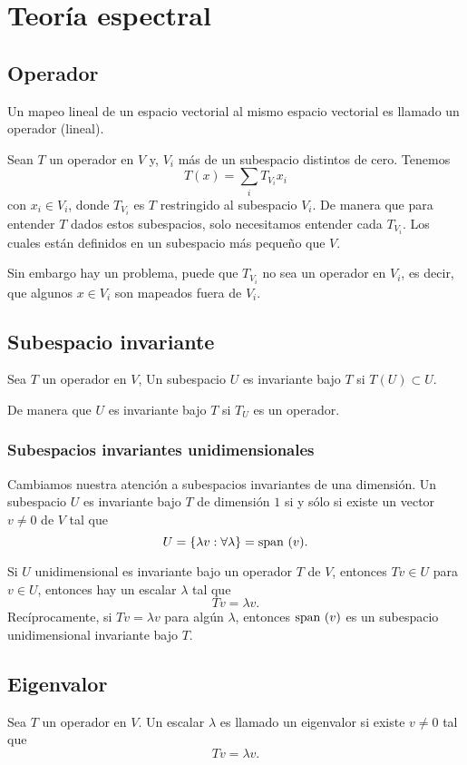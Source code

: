 \documentclass{article}
\begin{document}
\section{Teoría espectral}
\subsection{Operador}
Un mapeo lineal de un espacio vectorial al mismo espacio 
vectorial es llamado un operador (lineal).

Sean $T$ un operador en $V$ y, $V_i$ más de un subespacio
distintos de cero. Tenemos
$$T(x) = \sum_i T_{V_i}x_i$$
con $x_i\in V_i$, donde $T_{V_i}$ es $T$ restringido al
subespacio $V_i$. De manera que para entender $T$ dados
estos subespacios, solo necesitamos entender cada $T_{V_i}$.
Los cuales están definidos en un subespacio más pequeño que
$V$.

Sin embargo hay un problema, puede que $T_{V_i}$ no sea un
operador en $V_i$, es decir, que algunos $x\in V_i$
son mapeados fuera de $V_i$.

\subsection{Subespacio invariante}
Sea $T$ un operador en $V$, Un subespacio $U$ es invariante
bajo $T$ si $T(U)\subset U$.

De manera que $U$ es invariante bajo $T$ si $T_U$ es un
operador.

\subsubsection*{Subespacios invariantes unidimensionales}
Cambiamos nuestra atención a subespacios invariantes de una
dimensión. Un subespacio $U$ es invariante bajo $T$
de dimensión $1$
si y sólo si existe un vector $v\neq 0$ de $V$ tal que
$$U = \{\lambda v: \forall \lambda\} = \text{span }(v).$$

Si $U$ unidimensional es invariante bajo un operador $T$ de 
$V$, entonces $Tv\in U$ para $v\in U$, entonces hay un 
escalar $\lambda$ tal que 
$$Tv=\lambda v.$$
Recíprocamente, si $Tv=\lambda v$ para algún $\lambda$,
entonces $\text{span }(v)$ es un subespacio
unidimensional invariante bajo $T$.

\subsection{Eigenvalor}
Sea $T$ un operador en $V$. Un escalar $\lambda$ es llamado
un eigenvalor si existe $v\neq 0$ tal que
$$Tv=\lambda v.$$
\newpage
\end{document}
